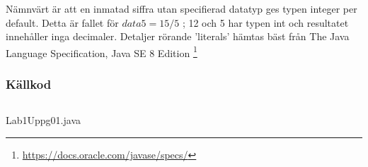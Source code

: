 
\par Nämnvärt är att en inmatad siffra utan specifierad datatyp ges typen
integer
per default. Detta är fallet för $data5 = 15 / 5$ ; 12 och 5 har typen int och
resultatet innehåller inga decimaler.  Detaljer rörande 'literals' hämtas bäst
från The Java Language Specification, Java SE 8 Edition
\footnote{\url{https://docs.oracle.com/javase/specs/}}



\subsubsection{Källkod}\label{uppgift-1_src}
    \inputminted[linenos]{java}{src/Lab1Uppg01.java}
    \caption{Lab1Uppg01.java}
    \label{Uppg1src}

